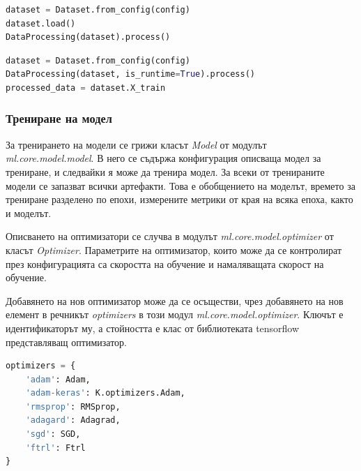 \documentclass{article}
\newcounter{subsubsubsection}[subsubsection]
\begin{document}
    \begin{lstlisting}[language=Python, caption=Обработка на наборът от данни за трениране на невронната мрежа]
dataset = Dataset.from_config(config)
dataset.load()
DataProcessing(dataset).process()
    \end{lstlisting}

    \begin{lstlisting}[language=Python, caption=Обработка на извлечените записи от социалните мрежи за изготвяне на предложенията]
dataset = Dataset.from_config(config)
DataProcessing(dataset, is_runtime=True).process()
processed_data = dataset.X_train
    \end{lstlisting}

    \subsubsection{Трениране на модел}

    За тренирането на модели се грижи класът \textit{Model} от модулът \textit{ml.core.model.model}. В него се съдържа
    конфигурация описваща модел за трениране, и следвайки я може да тренира модел. За всеки от тренираните модели се
    запазват всички артефакти. Това е обобщението на моделът, времето за трениране разделено по епохи, измерените метрики
    от края на всяка епоха, както и моделът.


    Описването на оптимизатори се случва в модулът \textit{ml.core.model.optimizer} от класът \textit{Optimizer}.
    Параметрите на оптимизатор, които може да се контролират през конфигурацията са скоростта на обучение и намаляващата
    скорост на обучение.

    Добавянето на нов оптимизатор може да се осъществи, чрез добавянето на нов елемент в речникът \textit{optimizers} в
    този модул \textit{ml.core.model.optimizer}. Ключът е идентификаторът му, а стойността е клас от библиотеката
    tensorflow представляващ оптимизатор.

    \begin{lstlisting}[language=Python, caption=Дефиниране на оптимизатор]
optimizers = {
    'adam': Adam,
    'adam-keras': K.optimizers.Adam,
    'rmsprop': RMSprop,
    'adagard': Adagrad,
    'sgd': SGD,
    'ftrl': Ftrl
}
    \end{lstlisting}

\end{document}
